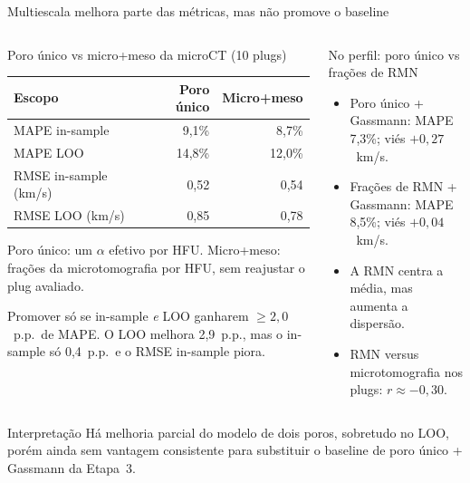 \documentclass[aspectratio=169,10pt]{beamer}
\begin{document}
\begin{frame}{Multiescala melhora parte das m\'etricas, mas n\~ao promove o baseline}
  \footnotesize
  \begin{columns}[T,onlytextwidth]
    \begin{block}{Poro \'unico vs micro+meso da microCT (10 plugs)}
      \scriptsize
      \begin{tabular}{lrr}
        \toprule
        Escopo & Poro \'unico & Micro+meso \\
        \midrule
        MAPE in-sample & 9,1\% & 8,7\% \\
        MAPE LOO & 14,8\% & 12,0\% \\
        RMSE in-sample (km/s) & 0,52 & 0,54 \\
        RMSE LOO (km/s) & 0,85 & 0,78 \\
        \bottomrule
      \end{tabular}\par
      \vspace{0.05cm}
      \raggedright
      Poro \'unico: um $\alpha$ efetivo por HFU.
      Micro+meso: fra\c{c}\~oes da microtomografia por HFU, sem
      reajustar o plug avaliado.\par
      \vspace{0.04cm}
      Promover s\'o se in-sample \emph{e} LOO ganharem
      $\geq 2{,}0$~p.p.\ de MAPE. O LOO melhora 2,9~p.p., mas o
      in-sample s\'o 0,4~p.p.\ e o RMSE in-sample piora.
    \end{block}
    \begin{exampleblock}{No perfil: poro \'unico vs fra\c{c}\~oes de RMN}
      \scriptsize
      \begin{itemize}
        \item Poro \'unico + Gassmann: MAPE 7,3\%; vi\'es $+0{,}27$~km/s.
        \item Fra\c{c}\~oes de RMN + Gassmann: MAPE 8,5\%;
              vi\'es $+0{,}04$~km/s.
        \item A RMN centra a m\'edia, mas aumenta a dispers\~ao.
        \item RMN versus microtomografia nos plugs: $r\approx-0{,}30$.
      \end{itemize}
    \end{exampleblock}
  \end{columns}
  \vspace{0.06cm}
  \begin{block}{Interpreta\c{c}\~ao}
    \scriptsize
    H\'a melhoria parcial do modelo de dois poros, sobretudo no LOO,
    por\'em ainda sem vantagem consistente para substituir o baseline
    de poro \'unico + Gassmann da Etapa~3.
  \end{block}
\end{frame}
\end{document}
